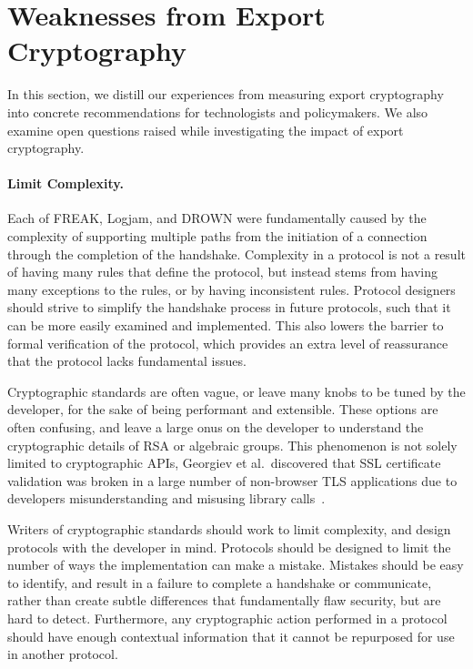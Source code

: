 \section{Weaknesses from Export Cryptography}

In this section, we distill our experiences from measuring export
cryptography into concrete recommendations for technologists and
policymakers. We also examine open questions raised while investigating the
impact of export cryptography.

\paragraph{Limit Complexity.}
Each of FREAK, Logjam, and DROWN were fundamentally caused by the complexity
of supporting multiple paths from the initiation of a connection through the
completion of the handshake. Complexity in a protocol is not a result of
having many rules that define the protocol, but instead stems from having
many exceptions to the rules, or by having inconsistent rules. Protocol
designers should strive to simplify the handshake process in future
protocols, such that it can be more easily examined and implemented. This
also lowers the barrier to formal verification of the protocol, which
provides an extra level of reassurance that the protocol lacks fundamental
issues.

Cryptographic standards are often vague, or leave many knobs to be tuned by
the developer, for the sake of being performant and extensible. These options
are often confusing, and leave a large onus on the developer to understand
the cryptographic details of RSA or algebraic groups. This phenomenon is not
solely limited to cryptographic APIs, Georgiev et al.\ discovered that SSL
certificate validation was broken in a large number of non-browser TLS
applications due to developers misunderstanding and misusing library
calls~\cite{most-dangerous-code-2012}.

Writers of cryptographic standards should work to limit complexity, and
design protocols with the developer in mind. Protocols should be designed to
limit the number of ways the implementation can make a mistake. Mistakes
should be easy to identify, and result in a failure to complete a handshake
or communicate, rather than create subtle differences that fundamentally flaw
security, but are hard to detect. Furthermore, any cryptographic action
performed in a protocol should have enough contextual information that it
cannot be repurposed for use in another protocol.

